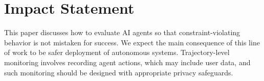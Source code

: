 \documentclass{article}
\begin{document}
\section*{Impact Statement}

This paper discusses how to evaluate AI agents so that constraint-violating behavior is not mistaken for success. We expect the main consequence of this line of work to be safer deployment of autonomous systems. Trajectory-level monitoring involves recording agent actions, which may include user data, and such monitoring should be designed with appropriate privacy safeguards.


\end{document}
